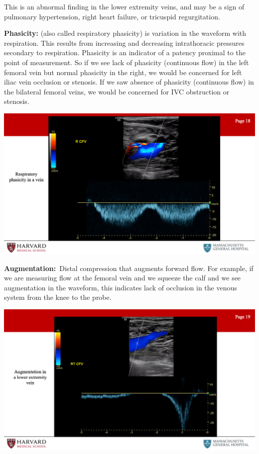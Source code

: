 \documentclass[
]{book}
\begin{document}
This is an abnormal finding in the lower extremity veins, and may be a
sign of pulmonary hypertension, right heart failure, or tricuspid
regurgitation.

\textbf{Phasicity:} (also called respiratory phasicity) is variation in the
waveform with respiration. This results from increasing and decreasing
intrathoracic pressures secondary to respiration. Phasicity is an
indicator of a patency proximal to the point of measurement. So if we
see lack of phasicity (continuous flow) in the left femoral vein but
normal phasicity in the right, we would be concerned for left iliac vein
occlusion or stenosis. If we saw absence of phasicity (continuous flow)
in the bilateral femoral veins, we would be concerned for IVC
obstruction or stenosis.

\includegraphics[width=15.01in]{images/vasc_lab2/Slide19}

\textbf{Augmentation:}~Distal compression that augments forward flow. For
example, if we are measuring flow at the femoral vein and we squeeze the
calf and we see augmentation in the waveform, this indicates lack of
occlusion in the venous system from the knee to the probe.

\includegraphics[width=15.01in]{images/vasc_lab2/Slide20}
\end{document}
